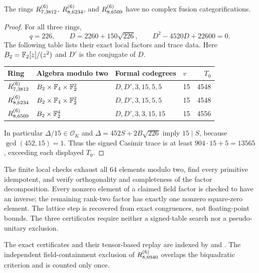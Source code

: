 \begin{corollary}
The rings $R^{(6)}_{7,3812}$, $R^{(6)}_{8,6234}$, and $R^{(6)}_{8,6509}$ have no
complex fusion categorifications.
\end{corollary}
\begin{proof}
For all three rings,
\[
 q=226,\qquad D=2260+150\sqrt{226},\qquad
 D^2-4520D+22600=0.
\]
The following table lists their exact local factors and trace data.
Here $B_2=\mathbb F_2[z]/(z^2)$ and $D'$ is the conjugate of $D$.
\begin{center}
\begin{tabular}{@{}llllr@{}}
\toprule
Ring & Algebra modulo two & Formal codegrees & $v$ & $T_0$\\
\midrule
$R^{(6)}_{7,3812}$ & $B_2\times\mathbb F_4\times\mathbb F_2^2$
 & $D,D',3,15,5,5$ & 15 & 4548\\
$R^{(6)}_{8,6234}$ & $B_2\times\mathbb F_4\times\mathbb F_2^2$
 & $D,D',3,15,5,5$ & 15 & 4548\\
$R^{(6)}_{8,6509}$ & $B_2\times\mathbb F_2^4$
 & $D,D',3,3,15,15$ & 15 & 4556\\
\bottomrule
\end{tabular}
\end{center}
In particular $\Delta/15\in\mathcal O_K$ and
$\Delta=452S+2B\sqrt{226}$ imply $15\mid S$, because
$\gcd(452,15)=1$.  Thus the signed Casimir trace is at least
$904\cdot15+5=13565$, exceeding each displayed $T_0$.
\end{proof}

The finite local checks exhaust all $64$ elements modulo two, find every
primitive idempotent, and verify orthogonality and completeness of the
factor decomposition.  Every nonzero element of a claimed field factor
is checked to have an inverse; the remaining rank-two factor has exactly
one nonzero square-zero element.  The lattice step is recovered from exact
congruences, not floating-point bounds.  The three certificates require
neither a signed-table search nor a pseudo-unitary exclusion.

The exact certificates and their tensor-based replay are indexed by
 and
.
The independent field-containment exclusion of $R^{(6)}_{8,6940}$
overlaps the biquadratic criterion and is counted only once.
